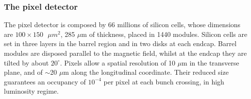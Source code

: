 \subsubsection{The pixel detector}
The pixel detector is composed by 66 millions of silicon cells, whose dimensions are $100 \times 150 \text{ }{\mu{m}}^2$, 285 $\mu$m of thickness, placed in 1440 modules. Silicon cells are set in three layers in the barrel region and in two disks at each endcap. Barrel modules are disposed parallel to the magnetic field, whilst at the endcap they are tilted by about $20^{\circ}$. 
Pixels allow a spatial resolution of 10 $\mu$m in the transverse plane, and of $\sim$20 $\mu$m along the longitudinal coordinate. Their reduced size guarantees an occupancy of $10^{-4}$ per pixel at each bunch crossing, in high luminosity regime.

